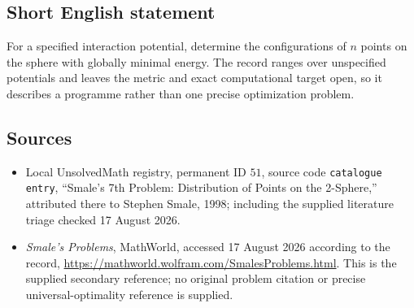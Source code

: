 \documentclass[11pt]{article}
\begin{document}
\subsection{Short English statement}
For a specified interaction potential, determine the configurations of $n$ points on the sphere with globally minimal energy. The record ranges over unspecified potentials and leaves the metric and exact computational target open, so it describes a programme rather than one precise optimization problem.
\subsection{Sources}
\begin{itemize}
\item Local UnsolvedMath registry, permanent ID $51$, source code \texttt{catalogue entry}, ``Smale's 7th Problem: Distribution of Points on the 2-Sphere,'' attributed there to Stephen Smale, 1998; including the supplied literature triage checked 17 August 2026.
\item \emph{Smale's Problems}, MathWorld, accessed 17 August 2026 according to the record, \url{https://mathworld.wolfram.com/SmalesProblems.html}. This is the supplied secondary reference; no original problem citation or precise universal-optimality reference is supplied.
\end{itemize}
\end{document}
